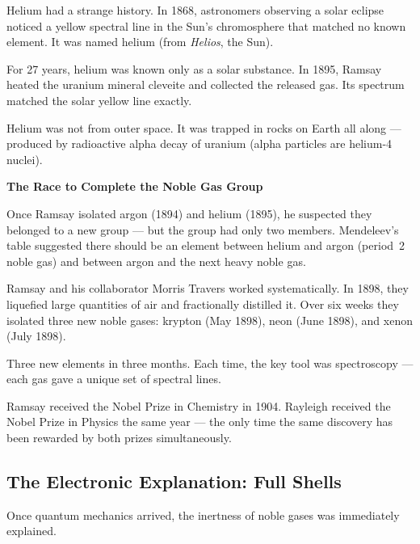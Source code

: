 \documentclass[12pt, a4paper]{book}
\begin{document}
Helium had a strange history.
In 1868, astronomers observing a solar eclipse noticed
a yellow spectral line in the Sun's chromosphere
that matched no known element.
It was named helium (from \textit{Helios}, the Sun).

For 27 years, helium was known only as a solar substance.
In 1895, Ramsay heated the uranium mineral cleveite
and collected the released gas.
Its spectrum matched the solar yellow line exactly.

Helium was not from outer space.
It was trapped in rocks on Earth all along ---
produced by radioactive alpha decay of uranium
(alpha particles are helium-4 nuclei).

\begin{historybox}
\textbf{The Race to Complete the Noble Gas Group}

Once Ramsay isolated argon (1894) and helium (1895),
he suspected they belonged to a new group ---
but the group had only two members.
Mendeleev's table suggested there should be an element
between helium and argon (period~2 noble gas)
and between argon and the next heavy noble gas.

Ramsay and his collaborator Morris Travers worked
systematically.
In 1898, they liquefied large quantities of air
and fractionally distilled it.
Over six weeks they isolated three new noble gases:
krypton (May 1898), neon (June 1898), and xenon (July 1898).

Three new elements in three months.
Each time, the key tool was spectroscopy ---
each gas gave a unique set of spectral lines.

Ramsay received the Nobel Prize in Chemistry in 1904.
Rayleigh received the Nobel Prize in Physics the same year ---
the only time the same discovery has been rewarded
by both prizes simultaneously.
\end{historybox}

\subsection{The Electronic Explanation: Full Shells}

Once quantum mechanics arrived, the inertness of noble
gases was immediately explained.
\end{document}
